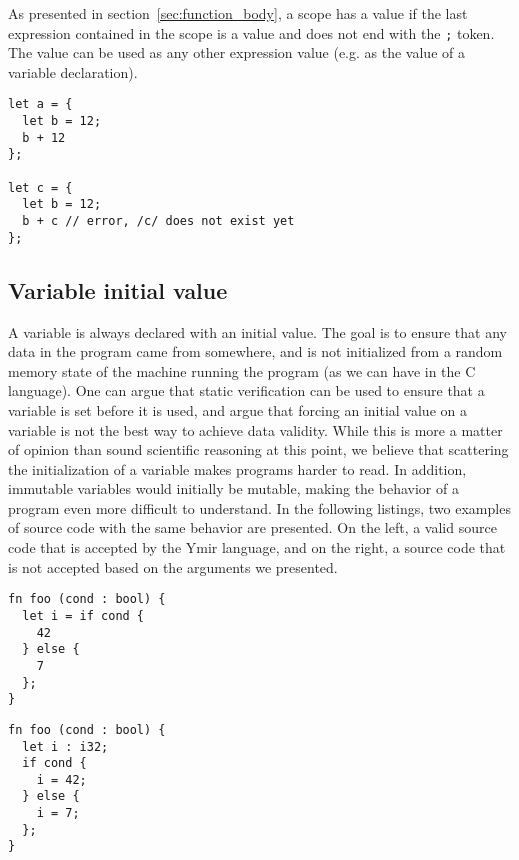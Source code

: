 As presented in section~\ref{sec:function_body}, a scope has a value if the last
expression contained in the scope is a value and does not end with the
\texttt{;} token. The value can be used as any other expression value (e.g. as
the value of a variable declaration).

\begin{lstlisting}[style=coloredverbatim]
let a = {
  let b = 12;
  b + 12
};

let c = {
  let b = 12;
  b + c // error, /c/ does not exist yet
};
\end{lstlisting}

\subsection{Variable initial value}

A variable is always declared with an initial value. The goal is to ensure that
any data in the program came from somewhere, and is not initialized from a
random memory state of the machine running the program (as we can have in the C
language). One can argue that static verification can be used to ensure that a
variable is set before it is used, and argue that forcing an initial value on a
variable is not the best way to achieve data validity. While this is more a
matter of opinion than sound scientific reasoning at this point, we believe that
scattering the initialization of a variable makes programs harder to read. In
addition, immutable variables would initially be mutable, making the behavior of
a program even more difficult to understand. In the following listings, two
examples of source code with the same behavior are presented. On the left, a
valid source code that is accepted by the Ymir language, and on the right, a
source code that is not accepted based on the arguments we presented.



\hspace{-15pt}%
\begin{minipage}[t][][t]{0.47\linewidth}
  \begin{lstlisting}[style=coloredverbatim, caption=Valid]
fn foo (cond : bool) {
  let i = if cond {
    42
  } else {
    7
  };
}
  \end{lstlisting}
\end{minipage}\hspace{10pt}%
\begin{minipage}[t][][t]{0.47\linewidth}
  \begin{lstlisting}[style=coloredverbatim, caption=Invalid]
fn foo (cond : bool) {
  let i : i32;
  if cond {
    i = 42;
  } else {
    i = 7;
  };
}
  \end{lstlisting}
\end{minipage}


